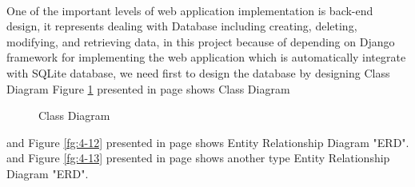 \documentclass[12pt,a4paper,class,twoside,openany]{report}
\begin{document}
{\paragraph*{\hspace{.9 cm} } One of the important levels of web application implementation is back-end design, it represents dealing with Database including creating, deleting, modifying, and retrieving data, in this project because of depending on Django framework for implementing the web application which is automatically integrate with SQLite database, we need first to design the database by designing Class Diagram Figure \ref{fg:4-11} presented in page \pageref{fg:4-11}shows Class Diagram 
\begin{figure}
\begin{center}
\caption{Class Diagram}
\label{fg:4-11}
\end{center}
\end{figure}
and Figure \ref{fg:4-12}  presented in page \pageref{fg:4-12}  shows Entity Relationship
 Diagram "ERD".
 and Figure \ref{fg:4-13}  presented in page \pageref{fg:4-13}  shows  another type Entity Relationship
 Diagram "ERD".
 
}
\end{document}
